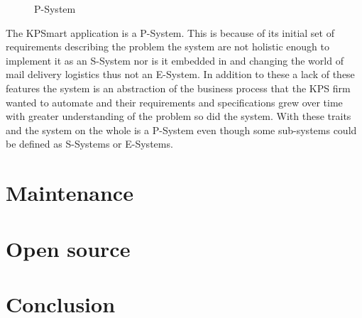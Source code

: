 \documentclass{style/CRPITStyle}
\renewcommand{\cite}{\citep}
\begin{document}
\vspace{.1in}

\begin{figure}[htb]
\caption{\protect\label{p-system}  P-System }
\end{figure}

\vspace{.1in}

The KPSmart application is a P-System. This is because of its initial set of
requirements describing the problem the system are not holistic enough to
implement it as an S-System nor is it embedded in and changing the world of mail
delivery logistics thus not an E-System. In addition to these a lack of
these features the system is an abstraction of the business process that the
KPS firm wanted to automate and their requirements and specifications grew over
time with greater understanding of the problem so did the system. With these
traits and the system on the whole is a P-System even though some sub-systems 
could be defined as S-Systems or E-Systems.

\section{Maintenance}

\section{Open source}

\cite{raymond:1999}

\section{Conclusion}



\end{document}
